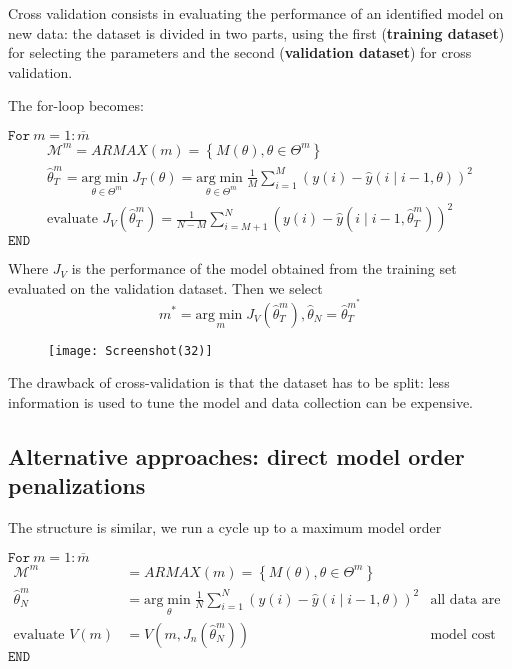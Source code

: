 Cross validation consists in evaluating the performance of an identified model on new data: the dataset is divided in two parts, using the first (\textbf{training dataset}) for selecting the parameters and the second (\textbf{validation dataset}) for cross validation.

The for-loop becomes:

$ \mathtt{For } \ m=1:\overline{m}$
\begin{gather*}
\mathcal{M}^{m} =ARMAX(m) =\left\{M(\theta) ,\theta \in \Theta ^{m}\right\}\\
\hat{\theta }_{T}^{m} =\underset{\theta \in \Theta ^{m}}{\mathrm{arg}\min} J_{T}(\theta) =\underset{\theta \in \Theta ^{m}}{\mathrm{arg}\min}\frac{1}{M}\sum _{i=1}^{M}(y(i) -\hat{y}(i\mid i-1,\theta))^{2}\\
\text{evaluate } J_{V}\left(\hat{\theta }_{T}^{m}\right) =\frac{1}{N-M}\sum _{i=M+1}^{N}\left(y(i) -\hat{y}\left(i\mid i-1,\hat{\theta }_{T}^{m}\right)\right)^{2}
\end{gather*}
$ \mathtt{END}$

Where $ J_{V}$ is the performance of the model obtained from the training set evaluated on the validation dataset. Then we select
\begin{equation*}
m^{*} =\underset{m}{\mathrm{arg}\min} J_{V}\left(\hat{\theta }_{T}^{m}\right) ,\hat{\theta }_{N} =\hat{\theta }_{T}^{m^{*}}
\end{equation*}

\begin{figure}[htpb]
    \centering
    \texttt{[image: Screenshot(32)]}
\end{figure}
\FloatBarrier
The drawback of cross-validation is that the dataset has to be split: less information is used to tune the model and data collection can be expensive.


\subsection{Alternative approaches: direct model order penalizations}
The structure is similar, we run a cycle up to a maximum model order

$ \mathtt{For } \ m=1:\overline{m}$
\begin{equation*}
\begin{aligned}
\mathcal{M}^{m} & =ARMAX(m) =\left\{M(\theta) ,\theta \in \Theta ^{m}\right\} & \\
\hat{\theta }_{N}^{m}  & =\underset{\theta }{\mathrm{arg}\min}\frac{1}{N}\sum _{i=1}^{N}(y(i) -\hat{y}(i\mid i-1,\theta))^{2} & \text{all data are used to tune the model}\\
\text{evaluate } V(m) & =V\left(m,J_{n}\left(\hat{\theta }_{N}^{m}\right)\right) & \text{model cost with model order penalization}
\end{aligned}
\end{equation*}
$ \mathtt{END}$

